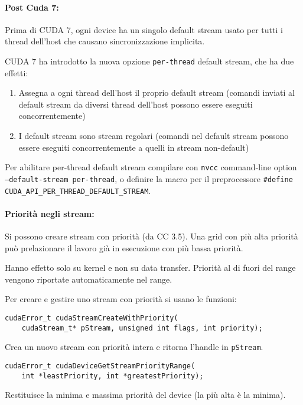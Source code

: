 \paragraph{Post Cuda 7:} Prima di CUDA 7, ogni device ha un singolo default stream usato per tutti i thread dell'host che causano sincronizzazione implicita. 

CUDA 7 ha introdotto la nuova opzione \texttt{per-thread} default stream, che ha due effetti:
\begin{enumerate}
	\item Assegna a ogni thread dell'host il proprio default stream (comandi inviati al default stream da diversi thread dell'host possono essere eseguiti concorrentemente)
	
	\item I default stream sono stream regolari (comandi nel default stream possono essere eseguiti concorrentemente a quelli in stream non-default)
\end{enumerate}

Per abilitare per-thread default stream compilare con \texttt{nvcc} command-line option \texttt{--default-stream per-thread}, o definire la macro per il preprocessore \texttt{\#define CUDA\_API\_PER\_THREAD\_DEFAULT\_STREAM}.

\paragraph{Priorità negli stream:} Si possono creare stream con priorità (da CC 3.5). Una grid con più alta priorità può prelazionare il lavoro già in esecuzione con più bassa priorità. 

Hanno effetto solo su kernel e non su data transfer. Priorità al di fuori del range vengono riportate automaticamente nel range.

Per creare e gestire uno stream con priorità si usano le funzioni:
\begin{verbatim}
cudaError_t cudaStreamCreateWithPriority(
    cudaStream_t* pStream, unsigned int flags, int priority);
\end{verbatim}

Crea un nuovo stream con priorità intera e ritorna l'handle in \texttt{pStream}.

\begin{verbatim}
cudaError_t cudaDeviceGetStreamPriorityRange(
    int *leastPriority, int *greatestPriority);
\end{verbatim}

Restituisce la minima e massima priorità del device (la più alta è la minima).


